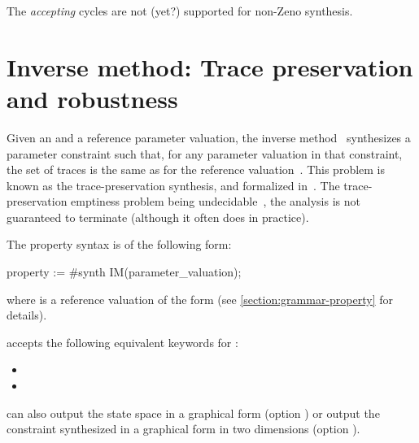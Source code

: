 \begin{remark}
	The \emph{accepting} cycles are not (yet?) supported for non-Zeno synthesis.
\end{remark}



\section{Inverse method: Trace preservation and robustness}\label{ss:mode:IM}

Given an \NIPTA{} and a reference parameter valuation, the inverse method~\IM{} synthesizes a parameter constraint such that, for any parameter valuation in that constraint, the set of traces is the same as for the reference valuation~\cite{ACEF09}.
This problem is known as the trace-preservation synthesis, and formalized in~\cite{ALM20}.
The trace-preservation emptiness problem being undecidable~\cite{ALM20}, the analysis is not guaranteed to terminate (although it often does in practice).

The property syntax is of the following form:

\begin{IMITATORproperty}
property := #synth IM(parameter_valuation);
\end{IMITATORproperty}

\noindent{}
where  is a reference valuation of the form  (see \cref{section:grammar-property} for details).

\begin{syntaxalias}
	\imitator{} accepts the following equivalent keywords for :
	\begin{itemize}
		\item {}
		\item {}
	\end{itemize}
\end{syntaxalias}


\imitator{} can also output the state space in a graphical form (option )
or
output the constraint synthesized in a graphical form in two dimensions (option ).

